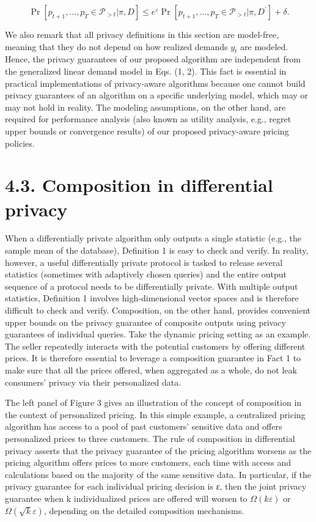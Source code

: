 \[
\operatorname * {P r} \left[ p _ {t + 1}, \dots , p _ {T} \in \mathcal {P} _ {> t} | \pi , D \right] \leq e ^ {\varepsilon} \operatorname * {P r} \left[ p _ {t + 1}, \dots , p _ {T} \in \mathcal {P} _ {> t} | \pi , D ^ {\prime} \right] + \delta . \tag {3}
\]

We also remark that all privacy definitions in this section are model-free, meaning that they do not depend on how realized demands \(y _ { t }\) are modeled. Hence, the privacy guarantees of our proposed algorithm are independent from the generalized linear demand model in Eqs. (1, 2). This fact is essential in practical implementations of privacy-aware algorithms because one cannot build privacy guarantees of an algorithm on a specific underlying model, which may or may not hold in reality. The modeling assumptions, on the other hand, are required for performance analysis (also known as utility analysis, e.g., regret upper bounds or convergence results) of our proposed privacy-aware pricing policies.

\section{4.3. Composition in differential privacy}\label{composition-in-differential-privacy}

When a differentially private algorithm only outputs a single statistic (e.g., the sample mean of the database), Definition 1 is easy to check and verify. In reality, however, a useful differentially private protocol is tasked to release several statistics (sometimes with adaptively chosen queries) and the entire output sequence of a protocol needs to be differentially private. With multiple output statistics, Definition 1 involves high-dimensional vector spaces and is therefore difficult to check and verify. Composition, on the other hand, provides convenient upper bounds on the privacy guarantee of composite outputs using privacy guarantees of individual queries. Take the dynamic pricing setting as an example. The seller repeatedly interacts with the potential customers by offering different prices. It is therefore essential to leverage a composition guarantee in Fact 1 to make sure that all the prices offered, when aggregated as a whole, do not leak consumers' privacy via their personalized data.

The left panel of Figure 3 gives an illustration of the concept of composition in the context of personalized pricing. In this simple example, a centralized pricing algorithm has access to a pool of past customers' sensitive data and offers personalized prices to three customers. The rule of composition in differential privacy asserts that the privacy guarantee of the pricing algorithm worsens as the pricing algorithm offers prices to more customers, each time with access and calculations based on the majority of the same sensitive data. In particular, if the privacy guarantee for each individual pricing decision is ε, then the joint privacy guarantee when k individualized prices are offered will worsen to \(\Omega ( k \varepsilon )\) or \(\Omega ( \sqrt { k } \varepsilon )\), depending on the detailed composition mechanisms.

